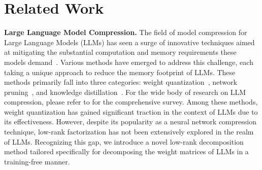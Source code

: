 \section{Related Work}
\vspace{-0.1in}
\noindent\textbf{Large Language Model Compression.}
The field of model compression for Large Language Models (LLMs) has seen a surge of innovative techniques aimed at mitigating the substantial computation and memory requirements these models demand~\citep{zhu2023survey,yuan2024llmunveiled}. 
Various methods have emerged to address this challenge, each taking a unique approach to reduce the memory footprint of LLMs. These methods primarily fall into three categories: weight quantization~\citep{courbariaux2015binaryconnect,dettmers2022llm}, network pruning~\citep{lecun1989optimal,frantar2023sparsegpt}, and knowledge distillation~\citep{hinton2015distilling,agarwal2023gkd}. 
For the wide body of research on LLM compression, please refer to
\citep{zhu2023survey} for the comprehensive survey. Among these methods, weight quantization has gained significant traction in the context of LLMs due to its effectiveness. However, despite its popularity as a neural network compression technique, low-rank factorization has not been extensively explored in the realm of LLMs. 
Recognizing this gap, we introduce a novel low-rank decomposition method tailored specifically for decomposing the weight matrices of LLMs in a training-free manner.

